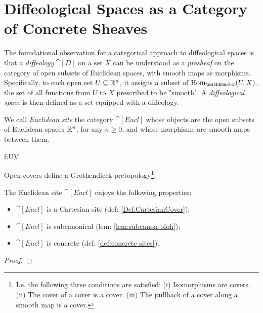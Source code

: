 \documentclass[a4paper,11pt]{article}  %
\newcommand{\Eucl}{\cat[Eucl]}
\begin{document}
\section{ Diffeological Spaces as a Category of Concrete Sheaves}
%
The foundational observation for a categorical approach to diffeological spaces is that a \emph{diffeology} \(\cat[D]\) on a set \(X\) can be understood as a \emph{presheaf} on the category of open subsets of Euclidean spaces, with smooth maps as morphisms. 
Specifically, to each open set \(U \subseteq \mathbb{R}^n\), it assigns a subset of $\Hom_{\Set}(U,X)$, the set of all functions from \(U\) to \(X\) prescribed to be "smooth". 
A \emph{diffeological space} is then defined as a set equipped with a diffeology.


\begin{definition}
	We call \emph{Euclidean site} the category $\Eucl$ whose objects are the open subsets of Euclidean spaces $\mathbb{R}^n$, for any $n \geq 0$,  and whose morphisms are smooth maps between them.
	
	\catdef{\Eucl}{U\subset\Real^n \text{\quad Open,}\forall n\geq 0 }
	{f:U\to V }

	Open covers define a Grothendieck pretopology\footnote{I.e. the following three conditions are satisfied: (i)
Isomorphisms are covers. (ii) The cover of a cover is a cover. (iii) The pullback of
a cover along a smooth map is a cover.}.

\end{definition}

\begin{proposition}
	The Euclidean site $\Eucl$ enjoys the following properties:
	\begin{itemize}
		\item $\Eucl$ is a Cartesian site (def: \cref{Def:CartesianCover});
		\item $\Eucl$ is subcanonical (lem: \cref{lem:subcanon-bloh});
		\item $\Eucl$ is concrete (def: \cref{def:concrete sites}).
	\end{itemize}
\end{proposition}
\begin{proof}
	\vspace{5em}
\end{proof}
\end{document}
